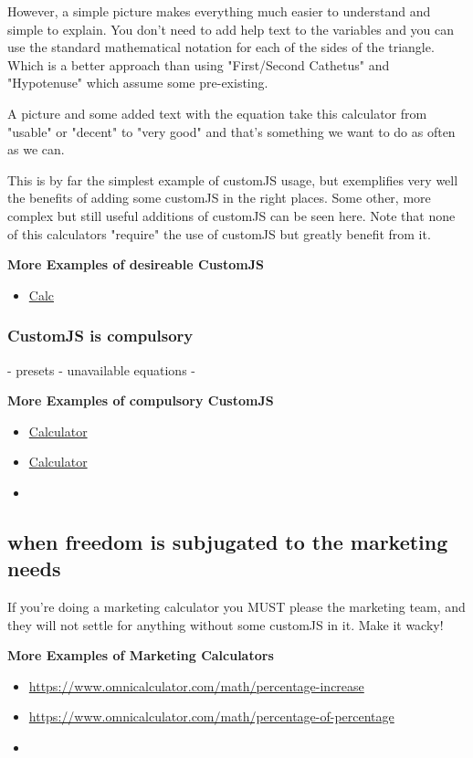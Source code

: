 However, a simple picture makes everything much easier to understand and simple to explain. You don't need to add help text to the variables and you can use the standard mathematical notation for each of the sides of the triangle. Which is a better approach than using "First/Second Cathetus" and "Hypotenuse" which assume some pre-existing. 

A picture and some added text with the equation take this calculator from "usable" or "decent" to "very good" and that's something we want to do as often as we can. 

This is by far the simplest example of customJS usage, but exemplifies very well the benefits of adding some customJS in the right places.  Some other, more complex but still useful additions of customJS can be seen here. Note that none of this calculators "require" the use of customJS but greatly benefit from it.

\textbf{More Examples of desireable CustomJS}
\begin{itemize}
    \item \href{url}{Calc}
\end{itemize}

\subsubsection{CustomJS is compulsory}
\label{subsub:compulsory}

- presets
- unavailable equations
- 

\textbf{More Examples of compulsory CustomJS}
\begin{itemize}
    \item \href{url}{Calculator}
    \item \href{url}{Calculator}
    \item \href{Calculator}{}
\end{itemize}
\subsection{when freedom is subjugated to the marketing needs}
\label{sub:marketing}
If you're doing a marketing calculator you MUST please the marketing team, and they will not settle for anything without some customJS in it. Make it wacky!


\textbf{More Examples of Marketing Calculators}
\begin{itemize}
    \item \href{Percentage Increase Calculator}{https://www.omnicalculator.com/math/percentage-increase}
    \item \href{Percentage of a Percentage Calculator}{https://www.omnicalculator.com/math/percentage-of-percentage}
    \item \href{Calculator}{}
\end{itemize}

    
